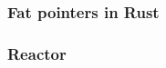 \begin{frame}[fragile]
    \frametitle{Fat pointers in Rust}
% 
% 
% 
% 
% 
% 
% 
% 
% 
% 
\end{frame}
\begin{frame}[fragile]
    \frametitle{Reactor}
% 
% 
% 
% 
\end{frame}
